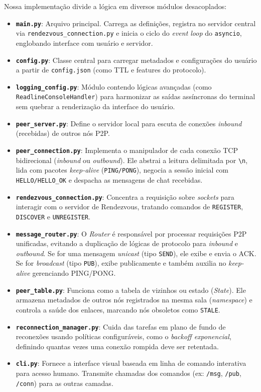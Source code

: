 \documentclass[12pt,a4paper]{article}
\begin{document}
Nossa implementação divide a lógica em diversos módulos desacoplados:
\begin{itemize}
    \item \textbf{\texttt{main.py}}: Arquivo principal. Carrega as definições, registra no servidor central via \texttt{rendezvous\_connection.py} e inicia o ciclo do \textit{event loop} do \texttt{asyncio}, englobando interface com usuário e servidor.
    \item \textbf{\texttt{config.py}}: Classe central para carregar metadados e configurações do usuário a partir de \texttt{config.json} (como TTL e features do protocolo).
    \item \textbf{\texttt{logging\_config.py}}: Módulo contendo lógicas avançadas (como \texttt{ReadlineConsoleHandler}) para harmonizar as saídas assíncronas do terminal sem quebrar a renderização da interface do usuário.
    \item \textbf{\texttt{peer\_server.py}}: Define o servidor local para escuta de conexões \textit{inbound} (recebidas) de outros nós P2P.
    \item \textbf{\texttt{peer\_connection.py}}: Implementa o manipulador de cada conexão TCP bidirecional (\textit{inbound} ou \textit{outbound}). Ele abstrai a leitura delimitada por \texttt{\textbackslash n}, lida com pacotes \textit{keep-alive} (\texttt{PING/PONG}), negocia a sessão inicial com \texttt{HELLO/HELLO\_OK} e despacha as mensagens de chat recebidas.
    \item \textbf{\texttt{rendezvous\_connection.py}}: Concentra a requisição sobre \textit{sockets} para interagir com o servidor de Rendezvous, tratando comandos de \texttt{REGISTER}, \texttt{DISCOVER} e \texttt{UNREGISTER}.
    \item \textbf{\texttt{message\_router.py}}: O \textit{Router} é responsável por processar requisições P2P unificadas, evitando a duplicação de lógicas de protocolo para \textit{inbound} e \textit{outbound}. Se for uma mensagem \textit{unicast} (tipo \texttt{SEND}), ele exibe e envia o ACK. Se for \textit{broadcast} (tipo \texttt{PUB}), exibe publicamente e também auxilia no \textit{keep-alive} gerenciando PING/PONG.
    \item \textbf{\texttt{peer\_table.py}}: Funciona como a tabela de vizinhos ou estado (\textit{State}). Ele armazena metadados de outros nós registrados na mesma sala (\textit{namespace}) e controla a saúde dos enlaces, marcando nós obsoletos como \texttt{STALE}.
    \item \textbf{\texttt{reconnection\_manager.py}}: Cuida das tarefas em plano de fundo de reconexões usando políticas configuráveis, como o \textit{backoff exponencial}, definindo quantas vezes uma conexão rompida deve ser retentada.
    \item \textbf{\texttt{cli.py}}: Fornece a interface visual baseada em linha de comando interativa para acesso humano. Transmite chamadas dos comandos (ex: \texttt{/msg}, \texttt{/pub}, \texttt{/conn}) para as outras camadas.
\end{itemize}
\end{document}
